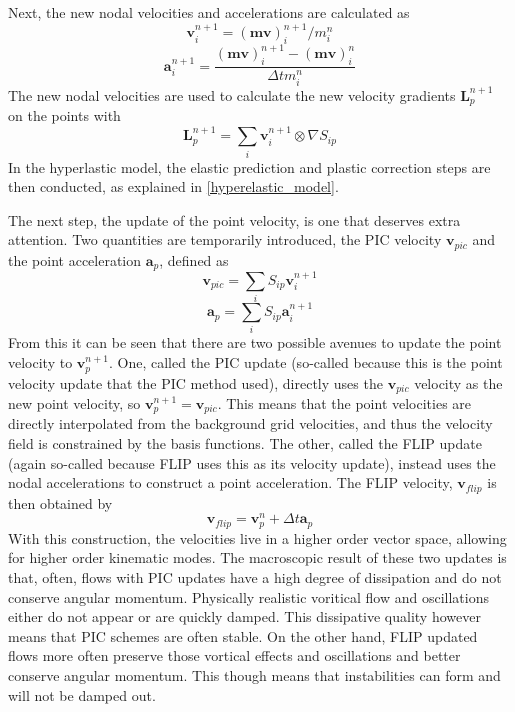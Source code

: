 Next, the new nodal velocities and accelerations are calculated as
\begin{equation}
\bm{v}^{n+1}_i=(\bm{mv})^{n+1}_i/m^n_i
\end{equation}
\begin{equation}
\bm{a}^{n+1}_i=\frac{(\bm{mv})^{n+1}_i-(\bm{mv})^n_i}{\Delta t m^n_i}
\end{equation}
The new nodal velocities are used to calculate the new velocity gradients $\bm{L}^{n+1}_p$ on the points with
\begin{equation}
\bm{L}^{n+1}_p=\sum_{i}\bm{v}^{n+1}_i \otimes\nabla S_{ip}
\end{equation}
In the hyperlastic model, the elastic prediction and plastic correction steps are then conducted, as explained in \ref{hyperelastic_model}.

The next step, the update of the point velocity, is one that deserves extra attention. Two quantities are temporarily introduced, the PIC velocity $\bm{v}_{pic}$ and the point acceleration $\bm{a}_p$, defined as
\begin{equation}
\bm{v}_{pic}=\sum_{i}S_{ip}\bm{v}^{n+1}_i
\label{pic_update}
\end{equation}
\begin{equation}
\bm{a}_p=\sum_{i}S_{ip}\bm{a}^{n+1}_i
\end{equation}
From this it can be seen that there are two possible avenues to update the point velocity to $\bm{v}^{n+1}_p$. One, called the PIC update (so-called because this is the point velocity update that the PIC method used), directly uses the $\bm{v}_{pic}$ velocity as the new point velocity, so $\bm{v}^{n+1}_p=\bm{v}_{pic}$. This means that the point velocities are directly interpolated from the background grid velocities, and thus the velocity field is constrained by the basis functions. The other, called the FLIP update (again so-called because FLIP uses this as its velocity update), instead uses the nodal accelerations to construct a point acceleration. The FLIP velocity, $\bm{v}_{flip}$ is then obtained by
\begin{equation}
\bm{v}_{flip}=\bm{v}^n_p+\Delta t \bm{a}_p
\label{flip_update}
\end{equation}
With this construction, the velocities live in a higher order vector space, allowing for higher order kinematic modes. The macroscopic result of these two updates is that, often, flows with PIC updates have a high degree of dissipation and do not conserve angular momentum. Physically realistic voritical flow and oscillations either do not appear or are quickly damped. This dissipative quality however means that PIC schemes are often stable. On the other hand, FLIP updated flows more often preserve those vortical effects and oscillations and better conserve angular momentum. This though means that instabilities can form and will not be damped out. 

